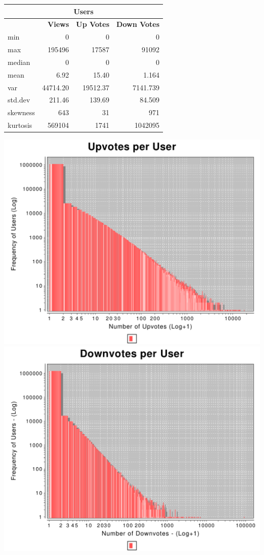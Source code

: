 \documentclass{article}
\begin{document}
\begin{tabular}[t]{| l | r |r|r|} \hline
\multicolumn{4}{|c|}{Users} \\ \hline
& \bf{Views} & \bf{Up Votes} & \bf{Down Votes} \\ \hline 
min      &          0  &      0 &      0  \\ \hline 
max      &     195496  &  17587 &  91092  \\ \hline 
median       &      0 &      0  &    0  \\ \hline  
mean         &      6.92   &    15.40 &      1.164  \\ \hline 
var       &     44714.20  &  19512.37  &  7141.739  \\ \hline 
std.dev     &     211.46  &    139.69 &     84.509  \\ \hline 
skewness & 643   &      31   &     971  \\ \hline 
kurtosis & 569104   &    1741 &   1042095  \\ \hline 
\end{tabular}

\includegraphics[width=\linewidth]{parser/upvotes.pdf}
\includegraphics[width=\linewidth]{parser/downvotes.pdf}
\end{document}
